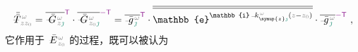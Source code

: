 \begin{align} \label{eq:transition_matrix}
	\Xint{\mathcolor{gray}{-}}{32}{\bar{\bar{T}}}^{\;\!\mathcolor{gray}{\omega}}_{\;\! \mathcolor{gray}{z} \mathcolor{gray}{z_0}} = \overline{\Xint{\mathcolor{gray}{-}}{20}{\bar{G}}^{\;\!\mathcolor{gray}{\omega}}_{\;\! \mathcolor{gray}{z} \textcolor{PineGreen}{\jmath}}}^{\mathsf{\textcolor{Plum}{T}}} \cdot \overline{\Xint{\mathcolor{gray}{-}}{20}{\bar{G}}^{\;\!\mathcolor{gray}{\omega}}_{\;\! \mathcolor{gray}{z_0} \textcolor{PineGreen}{\jmath}}}^{\textcolor{Plum}{-\mathsf{T}}} = \overline{\Xint{{}^{}_{\mathcolor{gray}{-}}}{10}{\bar{g}}^{\;\!\mathcolor{gray}{\omega}}_{\;\! \textcolor{PineGreen}{\jmath}}}^{\mathsf{\textcolor{Plum}{T}}} \cdot \overline{\overline{\mathbb{e}^{\mathbb{i} \Xint{\begin{smallmatrix} ~ \\ {}^{}_{\mathcolor{gray}{-}} \\ ~ \end{smallmatrix}}{15}{k}_{\symup{z} \textcolor{PineGreen}{\jmath}}^{\;\! \mathcolor{gray}{\omega}} \left( \mathcolor{gray}{z} - \mathcolor{gray}{z_0} \right)}}} \cdot \overline{\Xint{{}^{}_{\mathcolor{gray}{-}}}{10}{\bar{g}}^{\;\!\mathcolor{gray}{\omega}}_{\;\! \textcolor{PineGreen}{\jmath}}}^{\textcolor{Plum}{-\mathsf{T}}} ~,
\end{align}
它作用于 $\Xint{\mathcolor{gray}{-}}{25}{\bar{E}}^{\;\!\mathcolor{gray}{\omega}}_{\;\! \mathcolor{gray}{z_0}}$ 的过程，既可以被认为
